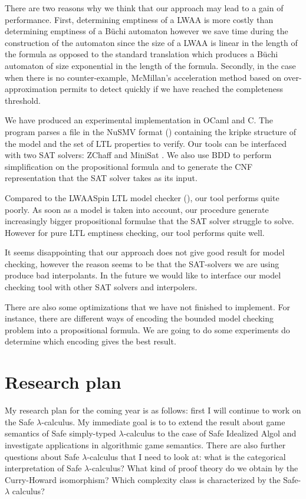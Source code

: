 There are two reasons why we think that our approach may lead to a
gain of performance. First, determining emptiness of a LWAA is more
costly than determining emptiness of a B\"uchi automaton however we
save time during the construction of the automaton since the size of
a LWAA is linear in the length of the formula as opposed to the
standard translation which produces a B\"uchi automaton of size
exponential in the length of the formula. Secondly, in the case when
there is no counter-example, McMillan's acceleration method based on
over-approximation permits to detect quickly if we have reached the
completeness threshold.


We have produced an experimental implementation in OCaml and C. The
program parses a file in the NuSMV format (\cite{CAV02:nusmv})
containing the kripke structure of the model and the set of LTL
properties to verify. Our tools can be interfaced with two SAT
solvers: ZChaff \citep{zChaff} and MiniSat \citep{ES03}. We also use
BDD to perform simplification on the propositional formula and to
generate the CNF representation that the SAT solver takes as its
input.

Compared to the LWAASpin LTL model checker (\cite{hammer:truly}),
our tool performs quite poorly. As soon as a model is taken into
account, our procedure generate increasingly bigger propositional
formulae that the SAT solver struggle to solve. However for pure LTL
emptiness checking, our tool performs quite well.

It seems disappointing that our approach does not give good result
for model checking, however the reason seems to be that the
SAT-solvers we are using produce bad interpolants. In the future we
would like to interface our model checking tool with other SAT
solvers and interpolers.

There are also some optimizations that we have not finished to
implement. For instance, there are different ways of encoding the
bounded model checking problem into a propositional formula. We are
going to do some experiments do determine which encoding gives the
best result.

\chapter{Research plan}

My research plan for the coming year is as follows: first I will
continue to work on the Safe $\lambda$-calculus. My immediate goal
is to to extend the result about game semantics of Safe simply-typed
$\lambda$-calculus to the case of Safe Idealized Algol and
investigate applications in algorithmic game semantics. There are
also further questions about Safe $\lambda$-calculus that I need to
look at: what is the categorical interpretation of Safe
$\lambda$-calculus? What kind of proof theory do we obtain by the
Curry-Howard isomorphism? Which complexity class is characterized by
the Safe-$\lambda$ calculus?

